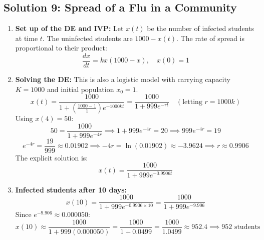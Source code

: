\documentclass[11pt,letterpaper]{article}
\begin{document}
\subsection*{Solution 9: Spread of a Flu in a Community}
\begin{enumerate}[label=(\alph*)]
    \item \textbf{Set up of the DE and IVP:}
    Let $x(t)$ be the number of infected students at time $t$. The uninfected students are $1000 - x(t)$.
    The rate of spread is proportional to their product:
    \[ \frac{dx}{dt} = k x(1000 - x), \quad x(0) = 1 \]

    \item \textbf{Solving the DE:}
    This is also a logistic model with carrying capacity $K = 1000$ and initial population $x_0 = 1$.
    \[ x(t) = \frac{1000}{1 + \left(\frac{1000 - 1}{1}\right) e^{-1000kt}} = \frac{1000}{1 + 999 e^{-rt}} \quad (\text{letting } r = 1000k) \]
    Using $x(4) = 50$:
    \[ 50 = \frac{1000}{1 + 999 e^{-4r}} \implies 1 + 999 e^{-4r} = 20 \implies 999 e^{-4r} = 19 \]
    \[ e^{-4r} = \frac{19}{999} \approx 0.01902 \implies -4r = \ln(0.01902) \approx -3.9624 \implies r \approx 0.9906 \]
    The explicit solution is:
    \[ x(t) = \frac{1000}{1 + 999 e^{-0.9906t}} \]

    \item \textbf{Infected students after 10 days:}
    \[ x(10) = \frac{1000}{1 + 999 e^{-0.9906 \times 10}} = \frac{1000}{1 + 999 e^{-9.906}} \]
    Since $e^{-9.906} \approx 0.000050$:
    \[ x(10) \approx \frac{1000}{1 + 999(0.000050)} = \frac{1000}{1 + 0.0499} = \frac{1000}{1.0499} \approx 952.4 \implies 952 \text{ students} \]
\end{enumerate}
\end{document}
